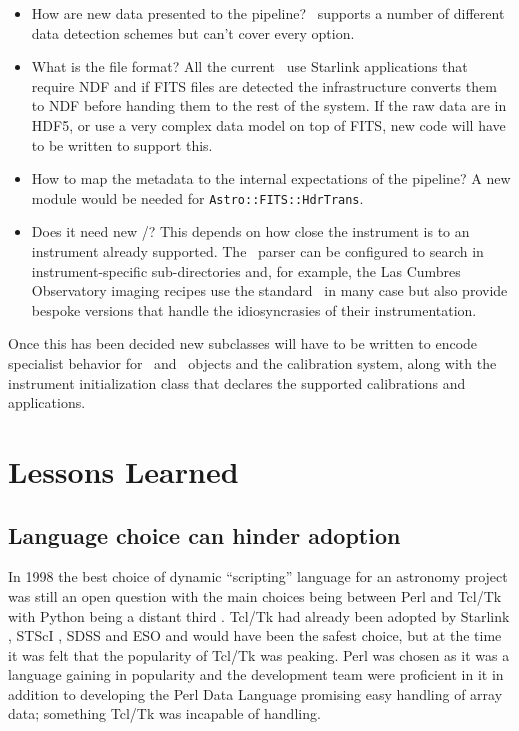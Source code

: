 \documentclass[final,authoryear,5p,times,twocolumn]{elsarticle}
\begin{document}
\begin{itemize}

\item How are new data presented to the pipeline? \oracdr\ supports a
  number of different data detection schemes but can't cover every option.

\item What is the file format? All the current \recipes\ use Starlink
  applications that require NDF \citep{ndfjenness} and if FITS
  files are detected the infrastructure converts them to NDF before
  handing them to the rest of the system. If the raw data are in HDF5,
  or use a very complex data model on top of FITS, new code will have
  to be written to support this.

\item How to map the metadata to the internal expectations of the
  pipeline? A new module would be needed for \texttt{Astro::FITS::HdrTrans}.

\item Does it need new \recipes/\primitives? This depends on how close
  the instrument is to an instrument already supported. The \recipe\
  parser can be configured to search in instrument-specific
  sub-directories and, for example, the Las Cumbres Observatory
  imaging recipes use the standard \primitives\ in many case but also
  provide bespoke versions that handle the idiosyncrasies of their
  instrumentation.

\end{itemize}

Once this has been decided new subclasses will have to be written to
encode specialist behavior for \Frame\ and \Group\ objects and the
calibration system, along with the instrument initialization class
that declares the supported calibrations and applications.

\section{Lessons Learned}

\subsection{Language choice can hinder adoption}

In 1998 the best choice of dynamic ``scripting'' language for an astronomy project was
still an open question with the main choices being between Perl and
Tcl/Tk with Python being a distant third
\citep{1995ComPh...9...57A,1999ASPC..172..494J,1999ASPC..172..483B,2000ASPC..216...91J}.
Tcl/Tk had already been adopted by Starlink
\citep{1995ASPC...77..395T}, STScI \citep{1998SPIE.3349...89D},
SDSS \citep{1996ASPC..101..248S} and ESO \citep{1996ASPC..101..396H,1995ASPC...77...58C} and
would have been the safest choice, but at the time it was felt that
the popularity of Tcl/Tk was peaking. Perl was chosen as it was a language
gaining in popularity and the development team were proficient in
it in addition to developing the Perl Data Language \citep[PDL;][]{PDL}
promising easy handling of array data; something Tcl/Tk was incapable
of handling.
\end{document}
